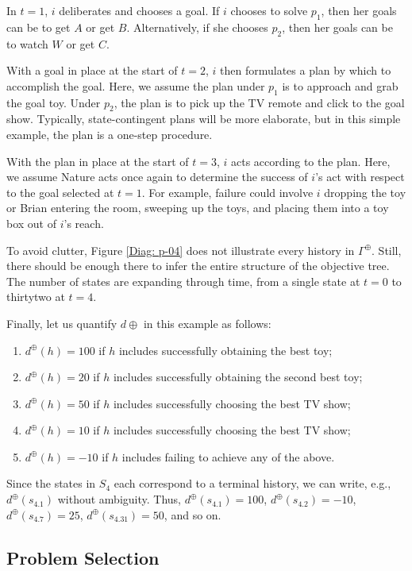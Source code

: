\documentclass[
11pt,
titlepage,
reqno,
]{article}%
\theoremstyle{definition}
\begin{document}
In $t=1$, $i$ deliberates and chooses a goal. 
If $i$ chooses to solve $p_1$, then her goals can be to get $A$ or get $B$.
Alternatively, if she chooses $p_2$, then her goals can be to watch $W$ or get $C$.

With a goal in place at the start of $t=2$, $i$ then formulates a plan by which to accomplish the goal. 
Here, we assume the plan under $p_1$ is to approach and grab the goal toy. 
Under  $p_2$, the plan is to pick up the TV remote and click to the goal show.
Typically, state-contingent plans will be more elaborate, but in this simple example, the plan is a one-step procedure.

With the plan in place at the start of $t=3$, $i$ acts according to the plan.
Here, we assume Nature acts once again to determine the success of $i$'s act with respect to the goal selected at $t=1$.
For example, failure could involve $i$ dropping the toy or Brian entering the room, sweeping up the toys, and placing them into a toy box out of $i$'s reach.

To avoid clutter, Figure \ref{Diag: p-04} does not illustrate every history in $\Gamma^\oplus$.
Still, there should be enough there to infer the entire structure of the objective tree.
The number of states are expanding through time, from a single state at $t=0$ to thirtytwo at $t=4$.

Finally, let us quantify $d\oplus$ in this example as follows:
\begin{enumerate}
	\item $d^\oplus(h)=100$ if $h$ includes successfully obtaining the best toy;
	\item $d^\oplus(h)=20$ if $h$ includes successfully obtaining the second best toy;
	\item $d^\oplus(h)=50$ if $h$ includes successfully choosing the best TV show;
	\item $d^\oplus(h)=10$ if $h$ includes successfully choosing the best TV show;
	\item $d^\oplus(h)=-10$ if $h$ includes failing to achieve any of the above.
\end{enumerate}
Since the states in $S_4$ each correspond to a terminal history, we can write, e.g., $d^\oplus(s_{4.1})$ without ambiguity.
Thus, $d^\oplus(s_{4.1})=100$, $d^\oplus(s_{4.2})=-10$,  $d^\oplus(s_{4.7})=25$, $d^\oplus(s_{4.31})=50$, and so on.


\subsection{Problem Selection}
\end{document}
